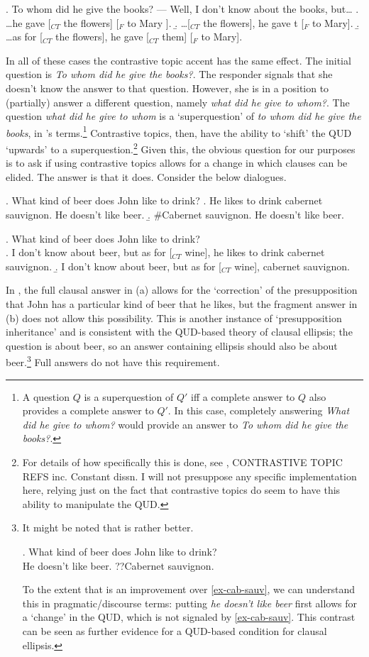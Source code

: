 \documentclass[11pt,letterpaper]{article}
\begin{document}
\ex. 	To whom did he give the books? ---  Well, I don't know about the books, but\ldots
	\a. \ldots he gave [$_{CT}$ the flowers] [$_{F}$ to Mary ].
	\b. \ldots [$_{CT}$ the flowers], he gave t [$_{F}$ to Mary].
	\b. \ldots as for [$_{CT}$ the flowers], he gave [$_{CT}$ them] [$_{F}$ to Mary].
	
In all of these cases the contrastive topic accent has the same effect.
The initial question is {\it To whom did he give the books?}.
The responder signals that she doesn't know the answer to that question.
However, she is in a position to (partially) answer a different question, namely {\it what did he give to whom?}.
The question {\it what did he give to whom} is a `superquestion' of {\it to whom did he give the books}, in \cite{RoQUD}'s terms.\footnote{A question $Q$ is a superquestion of $Q'$ iff a complete answer to $Q$ also provides a complete answer to $Q'$.
In this case, completely answering {\it What did he give to whom?} would provide an answer to {\it To whom did he give the books?}.}
Contrastive topics, then, have the ability to `shift' the QUD `upwards' to a superquestion.\footnote{For details of how specifically this is done, see \cite{RoQUD}, CONTRASTIVE TOPIC REFS inc. Constant dissn. %
I will not presuppose any specific implementation here, relying just on the fact that contrastive topics do seem to have this ability to manipulate the QUD.}
Given this, the obvious question for our purposes is to ask if using contrastive topics allows for a change in which clauses can be elided.
The answer is that it does.
Consider the below dialogues.

\ex. 	What kind of beer does John like to drink?
	\a. He likes to drink cabernet sauvignon. He doesn't like beer.
	\b. \#Cabernet sauvignon. He doesn't like beer.\label{ex-cab-sauv}
	
\ex. 	What kind of beer does John like to drink?\\
	\a. I don't know about beer, but as for [$_{CT}$ wine], he likes to drink cabernet sauvignon.
	\b. I don't know about beer, but as for [$_{CT}$ wine], cabernet sauvignon.
	
In \LLast, the full clausal answer in (a) allows for the `correction' of the presupposition that John has a particular kind of beer that he likes, but the fragment answer in (b) does not allow this possibility.
This is another instance of `presupposition inheritance' and is consistent with the QUD-based theory of clausal ellipsis; the question is about beer, so an answer containing ellipsis should also be about beer.\footnote{It might be noted that \Next is rather better.

\ex. 	What kind of beer does John like to drink?\\
	He doesn't like beer. ??Cabernet sauvignon.
	
To the extent that \Last is an improvement over \ref{ex-cab-sauv}, we can understand this in pragmatic/discourse terms: putting {\it he doesn't like beer} first allows for a `change' in the QUD, which is not signaled by \ref{ex-cab-sauv}.
This contrast can be seen as further evidence for a QUD-based condition for clausal ellipsis.}
Full answers do not have this requirement.
\end{document}

